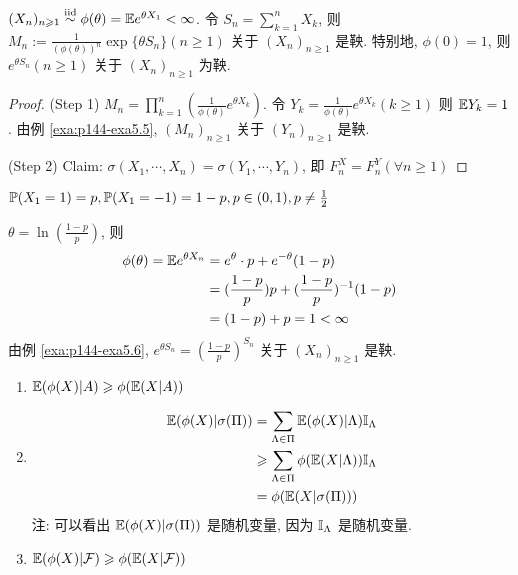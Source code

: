 \begin{example}[指数鞅]\label{exa:p144-exa5.6}
    $(X_n)_{n\geqslant 1}\overset{\text{iid}}{\sim}\phi(\theta)=\mathbb E e^{\theta X_1}<\infty$. 令 $S_n=\sum_{k=1}^n X_k$, 则 $\displaystyle M_n:=\frac{1}{(\phi(\theta))^n}\exp\{\theta S_n\}(n\geq 1)$ 关于 $(X_n)_{n\geq 1}$ 是鞅. 特别地, $\phi(0)=1$, 则 $e^{\theta S_n}(n\geq 1)$ 关于 $(X_n)_{n\geq 1}$ 为鞅.
\end{example}

\begin{proof}
    (Step 1) $\displaystyle M_n=\prod_{k=1}^n (\frac{1}{\phi(\theta)}e^{\theta X_k})$. 令 $Y_k=\frac{1}{\phi(\theta)}e^{\theta X_k}(k\geq 1)$ 则 $\mathbb E Y_k=1$. 由例 \ref{exa:p144-exa5.5}, $(M_n)_{n\geq 1}$ 关于 $(Y_n)_{n\geq 1}$ 是鞅.

    (Step 2) Claim: $\sigma(X_1,\cdots,X_n)=\sigma(Y_1,\cdots,Y_n)$, 即 $F_n^X=F_n^Y(\forall n\geq 1)$
\end{proof}

\begin{example}[赌徒破产]
    $\mathbb{P}(X_1=1)=p, \mathbb{P}(X_1=-1)=1-p,p\in (0,1),p\neq \frac{1}{2}$
\end{example}

$\theta=\ln(\frac{1-p}{p})$, 则
\[
\begin{aligned}
    \phi(\theta)=\mathbb E e^{\theta X_n}&=e^{\theta}\cdot p+e^{-\theta}(1-p)\\
    &=(\frac{1-p}{p})p+(\frac{1-p}{p})^{-1}(1-p)\\
    &=(1-p)+p=1<\infty
\end{aligned}
\]
由例 \ref{exa:p144-exa5.6}, $e^{\theta S_n}=(\frac{1-p}{p})^{S_n}$ 关于 $(X_n)_{n\geq 1}$ 是鞅.

\begin{lemma}[Jensen不等式]
    \begin{enumerate}
        \item $\mathbb E (\phi(X)|A)\geqslant \phi(\mathbb E(X|A))$
        \item \[
            \begin{aligned}
                \mathbb E(\phi(X)|\sigma(\Pi))&=\sum_{\Lambda\in \Pi}\mathbb E(\phi(X)|\Lambda)\mathbb I_{\Lambda}\\
                &\geqslant \sum_{\Lambda\in \Pi} \phi(\mathbb E(X|\Lambda))\mathbb I_{\Lambda}\\
                &=\phi(\mathbb E(X|\sigma(\Pi)))
            \end{aligned}
        \]
        注: 可以看出 $\mathbb E(\phi(X)|\sigma(\Pi))$ 是随机变量, 因为 $\mathbb I_{\Lambda}$ 是随机变量.
        \item $\mathbb E(\phi(X)|\mathcal{F})\geqslant \phi(\mathbb E(X|\mathcal{F}))$
    \end{enumerate}
\end{lemma}

